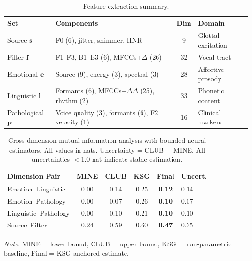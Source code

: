 

\begin{table}[t]
\centering
\caption{Feature extraction summary.}
\label{tab:features}
\begin{tabular}{llcl}
\toprule
\textbf{Set} & \textbf{Components} & \textbf{Dim} & \textbf{Domain} \\
\midrule
Source $\mathbf{s}$ & F0 (6), jitter, shimmer, HNR & 9 & Glottal excitation \\
Filter $\mathbf{f}$ & F1--F3, B1--B3 (6), MFCCs+$\Delta$ (26) & 32 & Vocal tract \\
Emotional $\mathbf{e}$ & Source (9), energy (3), spectral (3) & 28 & Affective prosody \\
Linguistic $\mathbf{l}$ & Formants (6), MFCCs+$\Delta\Delta$ (25), rhythm (2) & 33 & Phonetic content \\
Pathological $\mathbf{p}$ & Voice quality (3), formants (6), F2 velocity (1) & 16 & Clinical markers \\
\bottomrule
\end{tabular}
\end{table}


\begin{table}[t]
\centering
\caption{Cross-dimension mutual information analysis with bounded neural estimators. All values in nats. Uncertainty = CLUB $-$ MINE. All uncertainties $<$1.0 nat indicate stable estimation.}
\label{tab:mi_results}
\begin{tabular}{lccccl}
\toprule
\textbf{Dimension Pair} & \textbf{MINE} & \textbf{CLUB} & \textbf{KSG} & \textbf{Final} & \textbf{Uncert.} \\
\midrule
Emotion--Linguistic & 0.00 & 0.14 & 0.25 & \textbf{0.12} & 0.14 \\
Emotion--Pathology & 0.00 & 0.07 & 0.26 & \textbf{0.10} & 0.07 \\
Linguistic--Pathology & 0.00 & 0.10 & 0.21 & \textbf{0.10} & 0.10 \\
Source--Filter & 0.24 & 0.59 & 0.60 & \textbf{0.47} & 0.35 \\
\bottomrule
\end{tabular}
\vspace{1mm}
\small\textit{Note:} MINE = lower bound, CLUB = upper bound, KSG = non-parametric baseline, Final = KSG-anchored estimate.
\end{table}


